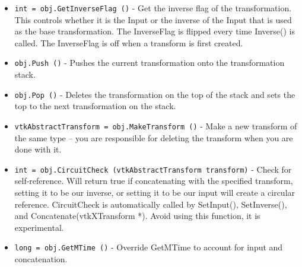 \begin{itemize}
\item  \verb|int = obj.GetInverseFlag ()| -  Get the inverse flag of the transformation.  This controls
 whether it is the Input or the inverse of the Input that
 is used as the base transformation.  The InverseFlag is
 flipped every time Inverse() is called.  The InverseFlag
 is off when a transform is first created.

\item  \verb|obj.Push ()| -  Pushes the current transformation onto the transformation stack.

\item  \verb|obj.Pop ()| -  Deletes the transformation on the top of the stack and sets the top 
 to the next transformation on the stack.

\item  \verb|vtkAbstractTransform = obj.MakeTransform ()| -  Make a new transform of the same type -- you are responsible for
 deleting the transform when you are done with it.

\item  \verb|int = obj.CircuitCheck (vtkAbstractTransform transform)| -  Check for self-reference.  Will return true if concatenating
 with the specified transform, setting it to be our inverse,
 or setting it to be our input will create a circular reference.
 CircuitCheck is automatically called by SetInput(), SetInverse(),
 and Concatenate(vtkXTransform *).  Avoid using this function,
 it is experimental.

\item  \verb|long = obj.GetMTime ()| -  Override GetMTime to account for input and concatenation.

\end{itemize}
